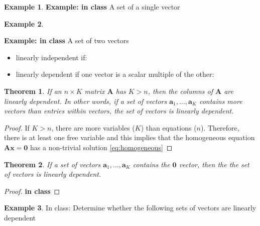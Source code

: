 \documentclass[
]{book}
\newtheorem{theorem}{Theorem}[chapter]
\theoremstyle{definition}
\theoremstyle{definition}
\newtheorem{example}{Example}[chapter]
\theoremstyle{definition}
\theoremstyle{remark}
\begin{document}
\begin{example}
\protect\hypertarget{exm:unnamed-chunk-105}{}{\label{exm:unnamed-chunk-105} }\textbf{Example: in class} A set of a single vector
\end{example}

\begin{example}
\protect\hypertarget{exm:unlabeled-div-68}{}\label{exm:unlabeled-div-68}

\textbf{Example: in class} A set of two vectors

\begin{itemize}
\item
  linearly independent if:
\item
  linearly dependent if one vector is a scalar multiple of the other:
\end{itemize}

\end{example}

\begin{theorem}
\protect\hypertarget{thm:unnamed-chunk-106}{}{\label{thm:unnamed-chunk-106} }If an \(n \times K\) matrix \(\mathbf{A}\) has \(K > n\), then the columns of \(\mathbf{A}\) are linearly dependent. In other words, if a set of vectors \(\mathbf{a}_1, \ldots, \mathbf{a}_K\) contains more vectors than entries within vectors, the set of vectors is linearly dependent.
\end{theorem}

\begin{proof}
{}If \(K>n\), there are more variables (\(K\)) than equations (\(n\)). Therefore, there is at least one free variable and this implies that the homogeneous equation \(\mathbf{A}\mathbf{x}=\mathbf{0}\) has a non-trivial solution \eqref{eq:homogeneous}
\end{proof}

\begin{theorem}
\protect\hypertarget{thm:unnamed-chunk-108}{}{\label{thm:unnamed-chunk-108} }If a set of vectors \(\mathbf{a}_1, \ldots, \mathbf{a}_K\) contains the \(\mathbf{0}\) vector, then the the set of vectors is linearly dependent.
\end{theorem}

\begin{proof}
{}\textbf{in class}
\end{proof}

\begin{example}
\protect\hypertarget{exm:unnamed-chunk-110}{}{\label{exm:unnamed-chunk-110} }In class: Determine whether the following sets of vectors are linearly dependent
\end{example}
\end{document}
